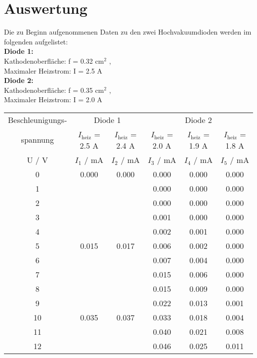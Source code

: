 \section{Auswertung}
\label{sec:Auswertung}
Die zu Beginn aufgenommenen Daten zu den zwei Hochvakuumdioden werden im folgenden aufgelistet:\\
\textbf{Diode 1:} \\
  Kathodenoberfläche: f = 0.32 cm$^{2}$ , \\
  Maximaler Heizstrom: I = 2.5 A \\
\textbf{Diode 2:} \\
  Kathodenoberfläche: f = 0.35 cm$^{2}$ , \\
  Maximaler Heizstrom: I = 2.0 A \\

  \begin{table} %
    \small
    \centering
    \begin{tabular}{c||c|c|c|c|c}
      \toprule
      Beschleunigungs- & \multicolumn{2}{c|}{Diode 1} & \multicolumn{3}{c}{Diode 2} \\
      spannung & $I_\text{heiz}$ = 2.5 A & $I_\text{heiz}$ = 2.4 A & $I_\text{heiz}$ = 2.0 A & $I_\text{heiz}$ = 1.9 A & $I_\text{heiz}$ = 1.8 A \\
      \midrule
      U / V & $I_1$ / mA & $I_2$ / mA & $I_3$ / mA & $I_4$ / mA & $I_5$ / mA \\
      \midrule
      0	  & 0.000 & 0.000 & 0.000	& 0.000	& 0.000 \\
      1	  &       &       & 0.000	& 0.000	& 0.000 \\
      2	  &       &       & 0.000	& 0.000	& 0.000 \\
      3	  &       &       & 0.001	& 0.000	& 0.000 \\
      4	  &       &       & 0.002	& 0.001	& 0.000 \\
      5	  & 0.015 & 0.017 & 0.006	& 0.002	& 0.000 \\
      6	  &       &       & 0.007	& 0.004	& 0.000 \\
      7	  &       &       & 0.015	& 0.006	& 0.000 \\
      8	  &       &       & 0.015	& 0.009	& 0.000 \\
      9	  &       &       & 0.022	& 0.013	& 0.001 \\
      10	& 0.035 & 0.037 & 0.033	& 0.018	& 0.004 \\
      11	&       &       & 0.040	& 0.021	& 0.008 \\
      12	&       &       & 0.046	& 0.025	& 0.011 \\

\end{tabular}
\end{table}
